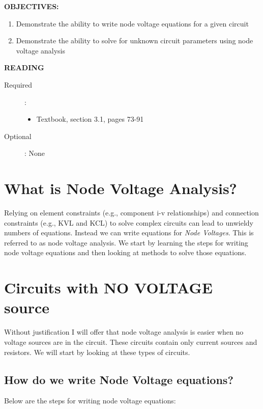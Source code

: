 \documentclass{handout}
\begin{document}
\maketitle


\textbf{OBJECTIVES:}
\begin{enumerate}
\item Demonstrate the ability to write node voltage equations for a given circuit
\item Demonstrate the ability to solve for unknown circuit parameters using node voltage analysis
\end{enumerate}

\textbf{READING}
\begin{description}
\item [Required]:
\begin{itemize}
\item  Textbook, section 3.1, pages 73-91
\end{itemize}
\item [Optional]: None
\end{description}


\section{What is Node Voltage Analysis?}
Relying on element constraints (e.g., component i-v relationships) and connection constraints (e.g., KVL and KCL) to solve complex circuits can lead to unwieldy numbers of equations.  Instead we can write equations for {\em Node Voltages}.  This is referred to as node voltage analysis.  We start by learning the steps for writing node voltage equations and then looking at methods to solve those equations.

\newpage
\pagebreak
\clearpage

\section{Circuits with NO VOLTAGE source}
Without justification I will offer that node voltage analysis is easier when no voltage sources are in the circuit.  These circuits contain only current sources and resistors.  We will start by looking at these types of circuits.

\subsection{How do we write Node Voltage equations?}
Below are the steps for writing node voltage equations:
\newpage
\pagebreak
\clearpage
\end{document}
